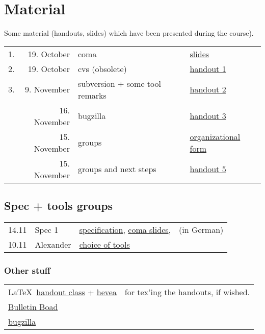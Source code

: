 

\section*{Material}

Some material (handouts, slides) which have been presented during the
course).

\begin{tabular}{r@{\quad\quad}rll}
  \hline
  1. & 19. October & coma  & 
  \href{slides/main-coma.pdf}{slides}
  \\
  2. & 19. October & cvs (obsolete) & \href{handouts/handout1.pdf}{handout 1}
  \\
  3. & 9. November & subversion + some tool remarks &
  \href{handouts/handout2.pdf}{handout 2}
  \\
   & 16. November & bugzilla &
  \href{handouts/handout3.pdf}{handout 3}
  \\
   & 15. November & groups &
  \href{handouts/handout4.pdf}{organizational form}
  \\
   & 15. November & groups and next steps &
  \href{handouts/handout5.pdf}{handout 5}
  \\
\end{tabular}




\subsection{Spec + tools groups}
\label{sec:material.spec-tools}


\begin{tabular}{llll}
  14.11 & Spec 1 & 
  \href{spec/material/spec1/spezifikation.pdf}{specification}, 
  \href{spec/material/spec1/slides.pdf}{coma slides}, 
  & (in German)
  \\
  10.11 & Alexander & \href{spec/material/derenbach/tools.pdf}{choice of tools}
\end{tabular}




\subsubsection*{Other stuff}

\begin{tabular}{ll}
 \LaTeX\ \href{misc/handout.cls}{handout class}  +
 \href{misc/hevea.sty}{hevea} & for tex'ing the handouts, if wished.
 \\
 \href{http://snert.informatik.uni-kiel.de:8080/~swprakt/phpBB2/}{Bulletin Boad}  
 \\
 \href{http://snert.informatik.uni-kiel.de:8080/~swprakt/bugzilla}{bugzilla}  
\end{tabular}





